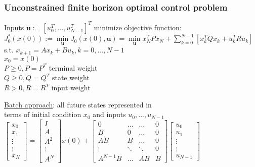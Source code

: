 \documentclass[10pt,parskip]{scrartcl}
\begin{document}
\begin{multicols*}{3}
\subsubsection{Unconstrained finite horizon optimal control problem}
Inputs $\mathbf u := [u_0^T, ..., u_{N-1}^T]^T$ minimize objective function:\\
$ J_0^*(x(0)) := \min\limits_{\mathbf u} J_0(x(0),\mathbf u) = \min\limits_{\mathbf u} x_N^T P x_N + \sum_{k=0}^{N-1} [x_k^T Q x_k + u_k^T R u_k]$\\
\hspace*{10mm}s.t. $x_{k+1} = A x_k + B u_k, k = 0,...,N-1$\\
\hspace*{17mm}$x_0 = x(0)$\\
$P \geq 0, P = P^T$ terminal weight\\
$Q \geq 0, Q = Q^T$ state weight\\
$R > 0, R = R^T$ input weight


\underline{Batch approach}: all future states represented in\\ 
terms of initial condition $x_0$ and inputs $u_0, ..., u_{N-1}$\\
$\begin{bmatrix}
 x_0 \\
 x_1  \\
 \vdots\\
 \vdots\\
 x_N
\end{bmatrix}
=
\begin{bmatrix}
 I \\
 A  \\
 A^2\\
 \vdots\\
 A^N
\end{bmatrix}
x(0)+
\begin{bmatrix}
 0 & \dots & \dots & 0\\
 B & 0 & \dots & 0 \\
 AB & B & \dots & 0\\
 \vdots & \ddots & \ddots & 0\\
 A^{N-1}B & \dots & AB & B
\end{bmatrix}
\begin{bmatrix}
 u_0 \\
 u_1  \\
 \vdots\\
 \vdots\\
 u_{N-1}
\end{bmatrix}
$


\end{multicols*}
\end{document}
